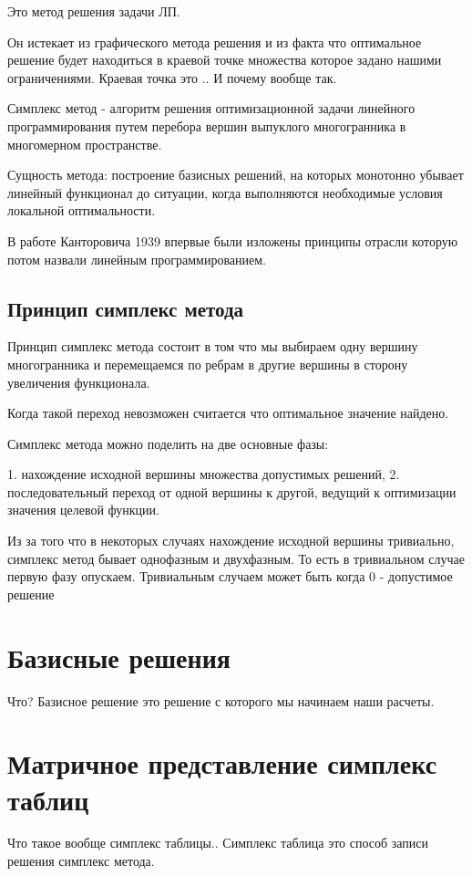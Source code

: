 \documentclass[a4paper,article,14pt]{extarticle}
\begin{document}
Это метод решения задачи ЛП.

Он истекает из графического метода решения и из факта что оптимальное решение будет находиться в краевой точке множества которое задано нашими ограничениями.
Краевая точка это ..
И почему вообще так.

Симплекс метод - алгоритм решения оптимизационной задачи линейного программирования путем перебора вершин выпуклого многогранника в многомерном пространстве.

Сущность метода: построение базисных решений, на которых монотонно убывает линейный функционал до ситуации, когда выполняются необходимые условия локальной оптимальности.

В работе Канторовича 1939 впервые были изложены принципы отрасли которую потом назвали линейным программированием.

\subsection{Принцип симплекс метода}

Принцип симплекс метода состоит в том что мы выбираем одну вершину многогранника и перемещаемся по ребрам в другие вершины в сторону увеличения функционала.

Когда такой переход невозможен считается что оптимальное значение найдено.

Симплекс метода можно поделить на две основные фазы:

1. нахождение исходной вершины множества допустимых решений,
2. последовательный переход от одной вершины к другой, ведущий к оптимизации значения целевой функции.

Из за того что в некоторых случаях нахождение исходной вершины тривиально, симплекс метод бывает однофазным и двухфазным.
То есть в тривиальном случае первую фазу опускаем.
Тривиальным случаем может быть когда 0 - допустимое решение

\section{Базисные решения}

Что?
Базисное решение это решение с которого мы начинаем наши расчеты.

\section{Матричное представление симплекс таблиц}

Что такое вообще симплекс таблицы..
Симплекс таблица это способ записи решения симплекс метода.
\end{document}
